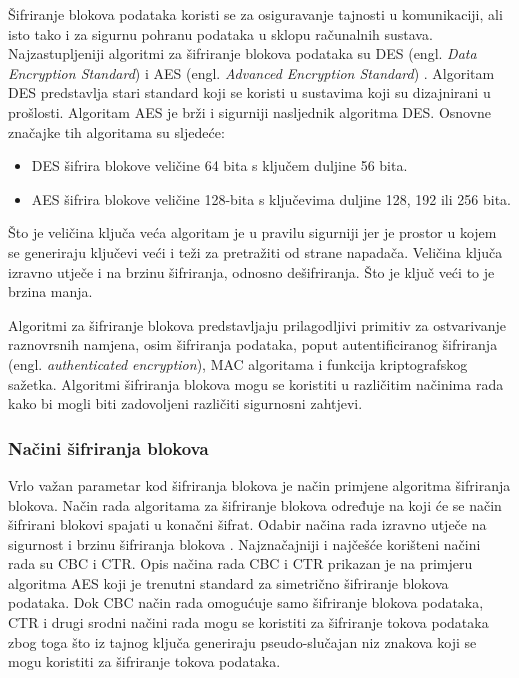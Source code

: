 Šifriranje blokova podataka koristi se za osiguravanje tajnosti u komunikaciji,
ali isto tako i za sigurnu pohranu podataka u sklopu računalnih sustava.
Najzastupljeniji algoritmi za šifriranje blokova podataka su DES (engl.
\emph{Data Encryption Standard}) \cite[str. 295]{van2011encyclopedia} i AES (engl. \emph{Advanced
Encryption Standard}) \cite[str.1046]{van2011encyclopedia}
\cite{daemen2013design}. Algoritam DES predstavlja stari standard koji
se koristi u sustavima koji su dizajnirani u prošlosti. Algoritam AES je brži i
sigurniji nasljednik algoritma DES. Osnovne značajke tih algoritama su sljedeće:
\begin{itemize}
\item DES šifrira blokove veličine 64 bita s ključem duljine 56 bita.
\item AES šifrira blokove veličine 128-bita s ključevima duljine 128, 192 ili
256 bita.
\end{itemize}
Što je veličina ključa veća algoritam je u pravilu sigurniji jer je prostor u
kojem se generiraju ključevi veći i teži za pretražiti od strane napadača.
Veličina ključa izravno utječe i na brzinu šifriranja, odnosno dešifriranja. Što
je ključ veći to je brzina manja.

Algoritmi za šifriranje blokova predstavljaju prilagodljivi primitiv za
ostvarivanje raznovrsnih namjena, osim šifriranja podataka, poput
autentificiranog šifriranja (engl. \emph{authenticated encryption}), MAC
algoritama i funkcija kriptografskog sažetka. Algoritmi šifriranja blokova
mogu se koristiti u različitim načinima rada kako bi mogli biti zadovoljeni
različiti sigurnosni zahtjevi.

\subsubsection{Načini šifriranja blokova}
Vrlo važan parametar kod šifriranja blokova je način primjene algoritma
šifriranja blokova. Način rada algoritama za šifriranje blokova
određuje na koji će se način šifrirani blokovi spajati u konačni šifrat. Odabir
načina rada izravno utječe na sigurnost i brzinu šifriranja blokova \cite[str.
790]{van2011encyclopedia}. Najznačajniji i najčešće korišteni načini rada su CBC
i CTR. Opis načina rada CBC i CTR prikazan je na primjeru algoritma AES koji je
trenutni
standard za simetrično šifriranje blokova podataka. Dok CBC način rada omogućuje
samo šifriranje blokova podataka, CTR i drugi srodni načini rada mogu se
koristiti za šifriranje tokova podataka zbog toga što iz tajnog ključa
generiraju pseudo-slučajan niz znakova koji se mogu koristiti za šifriranje
tokova podataka.

